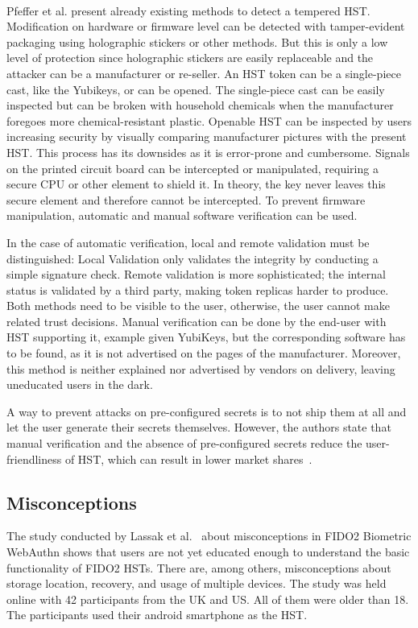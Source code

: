 \documentclass[runningheads]{llncs}
\begin{document}
\paragraph{}
Pfeffer et al. present already existing methods to detect a tempered HST.
Modification on hardware or firmware level can be detected with tamper-evident packaging using holographic stickers or other methods. But this is only a low level of protection since holographic stickers are easily replaceable and the attacker can be a manufacturer or re-seller. An HST token can be a single-piece cast, like the Yubikeys, or can be opened. The single-piece cast can be easily inspected but can be broken with household chemicals when the manufacturer foregoes more chemical-resistant plastic. Openable HST can be inspected by users increasing security by visually comparing manufacturer pictures with the present HST. This process has its downsides as it is error-prone and cumbersome. Signals on the printed circuit board can be intercepted or manipulated, requiring a secure CPU or other element to shield it. In theory, the key never leaves this secure element and therefore cannot be intercepted. To prevent firmware manipulation, automatic and manual software verification can be used. 

In the case of automatic verification, local and remote validation must be distinguished: Local Validation only validates the integrity by conducting a simple signature check. Remote validation is more sophisticated; the internal status is validated by a third party, making token replicas harder to produce. Both methods need to be visible to the user, otherwise, the user cannot make related trust decisions.
Manual verification can be done by the end-user with HST supporting it, example given YubiKeys, but the corresponding software has to be found, as it is not advertised on the pages of the manufacturer. Moreover, this method is neither explained nor advertised by vendors on delivery, leaving uneducated users in the dark.

A way to prevent attacks on pre-configured secrets is to not ship them at all and let the user generate their secrets themselves. However, the authors state that manual verification and the absence of pre-configured secrets reduce the user-friendliness of HST, which can result in lower market shares~\cite{272198}.

\subsection{Misconceptions}
The study conducted by Lassak et al.~\cite{274547} about misconceptions in FIDO2 Biometric WebAuthn shows that users are not yet educated enough to understand the basic functionality of FIDO2 HSTs. There are, among others, misconceptions about storage location, recovery, and usage of multiple devices. The study was held online with 42 participants from the UK and US. All of them were older than 18. The participants used their android smartphone as the HST.
\end{document}
